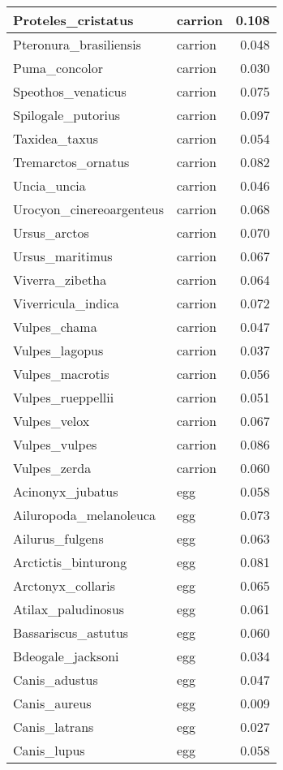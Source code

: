 \begin{table}
\begin{tabular}[t]{l|l|r}
\hline
Proteles\_cristatus & carrion & 0.108\\
\hline
Pteronura\_brasiliensis & carrion & 0.048\\
\hline
Puma\_concolor & carrion & 0.030\\
\hline
Speothos\_venaticus & carrion & 0.075\\
\hline
Spilogale\_putorius & carrion & 0.097\\
\hline
Taxidea\_taxus & carrion & 0.054\\
\hline
Tremarctos\_ornatus & carrion & 0.082\\
\hline
Uncia\_uncia & carrion & 0.046\\
\hline
Urocyon\_cinereoargenteus & carrion & 0.068\\
\hline
Ursus\_arctos & carrion & 0.070\\
\hline
Ursus\_maritimus & carrion & 0.067\\
\hline
Viverra\_zibetha & carrion & 0.064\\
\hline
Viverricula\_indica & carrion & 0.072\\
\hline
Vulpes\_chama & carrion & 0.047\\
\hline
Vulpes\_lagopus & carrion & 0.037\\
\hline
Vulpes\_macrotis & carrion & 0.056\\
\hline
Vulpes\_rueppellii & carrion & 0.051\\
\hline
Vulpes\_velox & carrion & 0.067\\
\hline
Vulpes\_vulpes & carrion & 0.086\\
\hline
Vulpes\_zerda & carrion & 0.060\\
\hline
Acinonyx\_jubatus & egg & 0.058\\
\hline
Ailuropoda\_melanoleuca & egg & 0.073\\
\hline
Ailurus\_fulgens & egg & 0.063\\
\hline
Arctictis\_binturong & egg & 0.081\\
\hline
Arctonyx\_collaris & egg & 0.065\\
\hline
Atilax\_paludinosus & egg & 0.061\\
\hline
Bassariscus\_astutus & egg & 0.060\\
\hline
Bdeogale\_jacksoni & egg & 0.034\\
\hline
Canis\_adustus & egg & 0.047\\
\hline
Canis\_aureus & egg & 0.009\\
\hline
Canis\_latrans & egg & 0.027\\
\hline
Canis\_lupus & egg & 0.058\\

\end{tabular}
\end{table}
